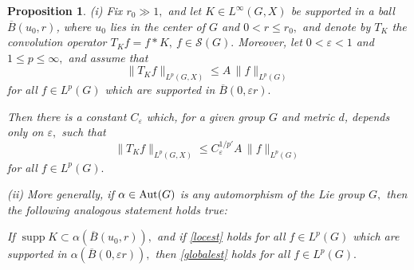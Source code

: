 \documentclass[leqno]{amsart}
\newtheorem{proposition}[theorem]{Proposition}
\theoremstyle{definition}
\theoremstyle{remark}
\numberwithin{equation}{section}
\newcommand{\scriptS}{\mathcal{S}}
\DeclareMathOperator*{\supp}{supp}
\newcommand\ve{{\varepsilon}}
\begin{document}
\begin{proposition}\label{localize-a}
(i) Fix $r_0\gg1,$ and let $K\in L^\infty(G,X)$ be supported in a ball $\overline B(u_0,r)$, where  $u_0$ lies in the center of $G$ and $0<r\le r_0,$ and denote by $T_K$ the convolution operator $T_Kf=f*K,\ f\in \scriptS(G).$ Moreover, let $0<\ve <1$  and $1\le p\le\infty,$ and assume that 
\begin{equation}\label{locest}
\|T_Kf\|_{L^p(G,X)}\le A\, \|f\|_{L^p(G)} 
\end{equation}
for all $f\in L^p(G)$ which are supported in $\overline B(0,\ve r).$ 

Then there is a constant $C_{\ve}$ which, for a given group $G$ and metric $d$, depends only on  $\ve,$ such that 
\begin{equation}\label{globalest}
\|T_Kf\|_{L^p(G,X)}\le C_{\ve}^{1/p'} A\, \|f\|_{L^p(G)} 
\end{equation}
for all $f\in L^p(G).$ 
\smallskip

(ii) More generally, if $\alpha\in {\rm Aut}(G)$ is any automorphism of the Lie group $G,$ then the following analogous statement holds true:
\smallskip

If $\supp K\subset \alpha(\overline B(u_0,r)),$ and if \eqref{locest} holds for all $f\in L^p(G)$ which are supported in 
$\alpha(\overline B(0,\ve r)), $  then \eqref{globalest} holds  for all  $f\in L^p(G).$ 

\end{proposition}
\end{document}
